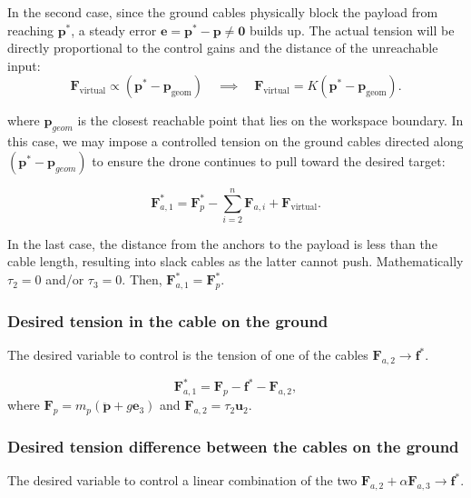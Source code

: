 In the second case, since the ground cables physically block the payload from reaching $\mathbf p^*$, a steady error $\mathbf e = \mathbf p^*-\mathbf p \neq \mathbf 0$ builds up. The actual tension will be directly proportional to the control gains and the distance of the unreachable input:
\begin{equation}
    \mathbf F_{\mathrm{virtual}} \propto \left( \mathbf p^*-\mathbf p_{\mathrm{geom}} \right) \quad\implies\quad    \mathbf F_{\mathrm{virtual}} = K\left(\mathbf p^*-\mathbf p_{\mathrm{geom}}\right).
\end{equation}

where $\mathbf p_{geom}$ is the closest reachable point that lies on the workspace boundary. In this case, we may impose a controlled tension on the ground cables directed along $(\mathbf p^* - \mathbf p_{geom})$ to ensure the drone continues to pull toward the desired target:

\begin{equation}
    \mathbf F_{a,1}^* = \mathbf F_p^* - \sum_{i=2}^{n}\mathbf F_{a,i} + \mathbf F_{\mathrm{virtual}}.
\end{equation}

In the last case, the distance from the anchors to the payload is less than the cable length, resulting into slack cables as the latter cannot push. Mathematically $\tau_2= 0$ and/or $\tau_3=0$. Then, $\mathbf F_{a,1}^* = \mathbf F_p^*$.

\subsubsection{Desired tension in the cable on the ground}
The desired variable to control is the tension of one of the cables $\mathbf F_{a,2} \xrightarrow{} \mathbf f^*$. 

\begin{equation}
    \mathbf F_{a,1}^* = \mathbf F_p - \mathbf f^* - \mathbf F_{a,2},
\end{equation}
where $\mathbf F_p = m_p \left( \ddot{\mathbf p} + g\mathbf e_3 \right)$ and $ \mathbf F_{a,2} = \tau_2\mathbf u_2$.

\subsubsection{Desired tension difference between the cables on the ground}
The desired variable to control a linear combination of the two $\mathbf F_{a,2} + \alpha\mathbf F_{a,3} \xrightarrow{} \mathbf f^*$.

